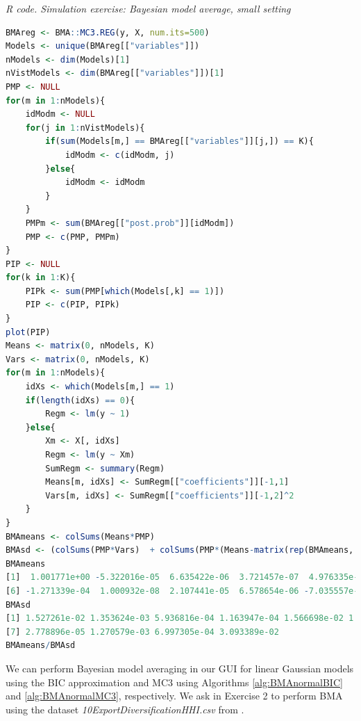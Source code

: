 \begin{tcolorbox}[enhanced,width=4.67in,center upper,
	fontupper=\large\bfseries,drop shadow southwest,sharp corners]
	\textit{R code. Simulation exercise: Bayesian model average, small setting}
	\begin{VF}
		\begin{lstlisting}[language=R]
BMAreg <- BMA::MC3.REG(y, X, num.its=500)
Models <- unique(BMAreg[["variables"]])
nModels <- dim(Models)[1]
nVistModels <- dim(BMAreg[["variables"]])[1]
PMP <- NULL
for(m in 1:nModels){
	idModm <- NULL
	for(j in 1:nVistModels){
		if(sum(Models[m,] == BMAreg[["variables"]][j,]) == K){
			idModm <- c(idModm, j)
		}else{
			idModm <- idModm
		} 
	}
	PMPm <- sum(BMAreg[["post.prob"]][idModm])
	PMP <- c(PMP, PMPm)
}
PIP <- NULL
for(k in 1:K){
	PIPk <- sum(PMP[which(Models[,k] == 1)])
	PIP <- c(PIP, PIPk)
}
plot(PIP)
Means <- matrix(0, nModels, K)
Vars <- matrix(0, nModels, K)
for(m in 1:nModels){
	idXs <- which(Models[m,] == 1)
	if(length(idXs) == 0){
		Regm <- lm(y ~ 1)
	}else{
		Xm <- X[, idXs]
		Regm <- lm(y ~ Xm)
		SumRegm <- summary(Regm)
		Means[m, idXs] <- SumRegm[["coefficients"]][-1,1]
		Vars[m, idXs] <- SumRegm[["coefficients"]][-1,2]^2 
	} 
}
BMAmeans <- colSums(Means*PMP)
BMAsd <- (colSums(PMP*Vars)  + colSums(PMP*(Means-matrix(rep(BMAmeans, each = nModels), nModels, K))^2))^0.5
BMAmeans
[1]  1.001771e+00 -5.322016e-05  6.635422e-06  3.721457e-07  4.976335e-01
[6] -1.271339e-04  1.000932e-08  2.107441e-05  6.578654e-06 -7.035557e-01 
BMAsd
[1] 1.527261e-02 1.353624e-03 5.936816e-04 1.163947e-04 1.566698e-02 1.987360e-03
[7] 2.778896e-05 1.270579e-03 6.997305e-04 3.093389e-02
BMAmeans/BMAsd
\end{lstlisting}
	\end{VF}
\end{tcolorbox}

We can perform Bayesian model averaging in our GUI for linear Gaussian models using the BIC approximation and MC3 using Algorithms \ref{alg:BMAnormalBIC} and \ref{alg:BMAnormalMC3}, respectively. We ask in Exercise 2 to perform BMA using the dataset \textit{10ExportDiversificationHHI.csv} from \cite{Jetter2015}.  

